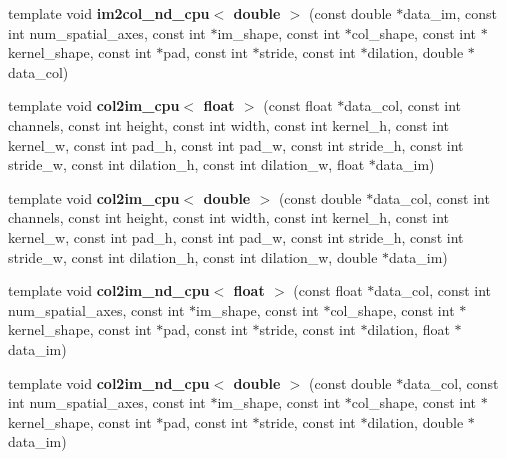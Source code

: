 \begin{DoxyCompactItemize}
\item 
template void {\bfseries im2col\+\_\+nd\+\_\+cpu$<$ double $>$} (const double $\ast$data\+\_\+im, const int num\+\_\+spatial\+\_\+axes, const int $\ast$im\+\_\+shape, const int $\ast$col\+\_\+shape, const int $\ast$kernel\+\_\+shape, const int $\ast$pad, const int $\ast$stride, const int $\ast$dilation, double $\ast$data\+\_\+col)\hypertarget{namespacecaffe_a9ea6bae3990440edd188a8821b436638}{}\label{namespacecaffe_a9ea6bae3990440edd188a8821b436638}

\item 
template void {\bfseries col2im\+\_\+cpu$<$ float $>$} (const float $\ast$data\+\_\+col, const int channels, const int height, const int width, const int kernel\+\_\+h, const int kernel\+\_\+w, const int pad\+\_\+h, const int pad\+\_\+w, const int stride\+\_\+h, const int stride\+\_\+w, const int dilation\+\_\+h, const int dilation\+\_\+w, float $\ast$data\+\_\+im)\hypertarget{namespacecaffe_aa156af000fb6e8d19ac363b8c369a7b5}{}\label{namespacecaffe_aa156af000fb6e8d19ac363b8c369a7b5}

\item 
template void {\bfseries col2im\+\_\+cpu$<$ double $>$} (const double $\ast$data\+\_\+col, const int channels, const int height, const int width, const int kernel\+\_\+h, const int kernel\+\_\+w, const int pad\+\_\+h, const int pad\+\_\+w, const int stride\+\_\+h, const int stride\+\_\+w, const int dilation\+\_\+h, const int dilation\+\_\+w, double $\ast$data\+\_\+im)\hypertarget{namespacecaffe_afa96e21891b2b26f6cb5d6245f593048}{}\label{namespacecaffe_afa96e21891b2b26f6cb5d6245f593048}

\item 
template void {\bfseries col2im\+\_\+nd\+\_\+cpu$<$ float $>$} (const float $\ast$data\+\_\+col, const int num\+\_\+spatial\+\_\+axes, const int $\ast$im\+\_\+shape, const int $\ast$col\+\_\+shape, const int $\ast$kernel\+\_\+shape, const int $\ast$pad, const int $\ast$stride, const int $\ast$dilation, float $\ast$data\+\_\+im)\hypertarget{namespacecaffe_a079fc62a03335d277312a98c6ade5b3d}{}\label{namespacecaffe_a079fc62a03335d277312a98c6ade5b3d}

\item 
template void {\bfseries col2im\+\_\+nd\+\_\+cpu$<$ double $>$} (const double $\ast$data\+\_\+col, const int num\+\_\+spatial\+\_\+axes, const int $\ast$im\+\_\+shape, const int $\ast$col\+\_\+shape, const int $\ast$kernel\+\_\+shape, const int $\ast$pad, const int $\ast$stride, const int $\ast$dilation, double $\ast$data\+\_\+im)\hypertarget{namespacecaffe_a6d768b294dffe57d67440555d8f19e89}{}\label{namespacecaffe_a6d768b294dffe57d67440555d8f19e89}


\end{DoxyCompactItemize}
